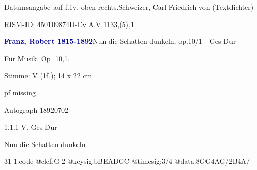 \documentclass[a4paper, twocolumn, 11pt]{book}
\begin{document}
\newline %
\par Datumsangabe auf f.1v, oben rechts.\newline Schweizer, Carl Friedrich von  (Textdichter)
\par RISM-ID: 450109874\newline D-Cv  A.V,1133,(5),1
\par \vspace{16pt} \textcolor{darkblue}{\textbf{Franz, Robert  1815-1892}}\hfillplus{[31]}\newline Nun die Schatten dunkeln, op.10/1 - Ges-Dur
\par \begin{itshape} Für Musik. Op. 10,1.\end{itshape} 
\par \textcolor{darkblue}{}  Stimme: V  (1f.); 14 x 22 cm\newline \begin{small} pf missing\end{small} \newline Autograph  18920702
\par 1.1.1  V, Ges-Dur\newline \begin{footnotesize} Nun die Schatten dunkeln \end{footnotesize}  
\begin{filecontents*}{31-1.code}
@clef:G-2
@keysig:bBEADGC
@timesig:3/4
@data:8GG4AG/2B4A/
\end{filecontents*}
\end{document}
